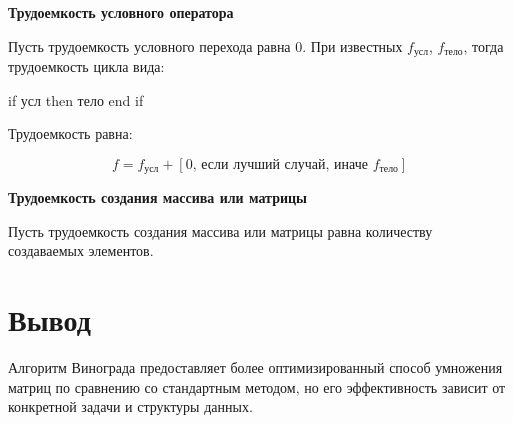 \textbf{Трудоемкость условного оператора}

Пусть трудоемкость условного перехода равна 0. При известных $f_\text{усл}$, $f_{\text{тело}}$, тогда трудоемкость цикла вида:

if усл then тело end if

Трудоемкость равна:

\begin{equation}
    \label{eq:work2}
    f = f_{\text{усл}} + [0\text{, если лучший случай, иначе } f_{\text{тело}}]
\end{equation}

\textbf{Трудоемкость создания массива или матрицы}

Пусть трудоемкость создания массива или матрицы равна количеству создаваемых элементов.

\section{Вывод}

Алгоритм Винограда предоставляет более оптимизированный способ умножения матриц по сравнению со стандартным методом, но его эффективность зависит от конкретной задачи и структуры данных.

\clearpage